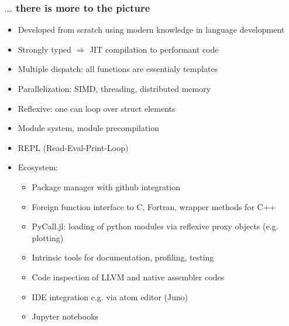 \begin{frame}\frametitle{$\dots$ there is more to the picture}
  \begin{itemize}
  \item Developed from scratch using modern knowledge in language development
  \item Strongly typed $\Rightarrow$ JIT compilation to performant code
  \item Multiple dispatch: all functions are essentialy templates
  \item Parallelization: SIMD, threading, distributed  memory
  \item Reflexive: one can loop over struct elements
  \item Module system, module precompilation
  \item REPL (Read-Eval-Print-Loop)
    
  \item Ecosystem:
    \begin{itemize}
    \item Package manager with github integration
    \item Foreign function interface to C, Fortran, wrapper methods for  C++
    \item PyCall.jl: loading of python modules via reflexive proxy objects (e.g. plotting)
    \item Intrinsic tools for documentation, profiling, testing
    \item Code inspection of LLVM and native assembler codes
    \item IDE integration e.g. via atom editor (Juno)
    \item Jupyter notebooks
    \end{itemize}
  \end{itemize}
\end{frame}



